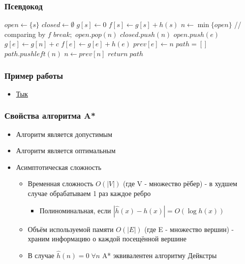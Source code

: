 \documentclass{style}
\begin{document}
\begin{frame}[fragile]
    \frametitle{Псевдокод}
    \begin{tiny}
        \begin{algorithmic}[1]
            \State $open \leftarrow \{s\}$
            \State $closed \leftarrow \emptyset$
            \State $g[s] \leftarrow 0$
            \State $f[s] \leftarrow g[s] + h(s)$
                \State $n \leftarrow \min\{open\}$ // comparing by $f$
                    \State $break;$
                \EndIf
                \State $open.pop(n)$
                \State $closed.push(n)$
                        \State $open.push(e)$
                        \State $g[e] \leftarrow g[n] + c$
                        \State $f[e] \leftarrow g[e] + h(e)$
                        \State $prev[e] \leftarrow n$
                    \EndIf
                \EndFor
            \EndWhile
            \State $path = []$ 
                \State $path.pushleft(n)$
                \State $n \leftarrow prev[n]$
            \EndWhile
            \State $return \; path$
        \EndProcedure
        \end{algorithmic}
    \end{tiny}
\end{frame}

\begin{frame}
    \frametitle{Пример работы}
    \begin{itemize}
        \item \href{https://frolov.icu/astar/example}{Тык}
    \end{itemize}
\end{frame}

\begin{frame}
    \frametitle{Свойства алгоритма A*}
    \begin{itemize}
        \item Алгоритм является допустимым
        \item Алгоритм является оптимальным
        \item Асимптотическая сложность
        \begin{itemize}
            \item Временная сложность $O(|V|)$ (где V - множество рёбер) - в худшем случае обрабатываем 1 раз каждое ребро
            \begin{itemize}
                \item Полиноминальная, если $|\hat{h}(x) - h(x)| = O(\log h(x))$
            \end{itemize}
            \item Объём используемой памяти $O(|E|)$ (где E - множество вершин) - храним информацию о каждой посещённой вершине
        \item В случае $\hat{h}(n) = 0 \; \forall n$ A* эквивалентен алгоритму Дейкстры
        \end{itemize}
    \end{itemize}
\end{frame}
\end{document}
